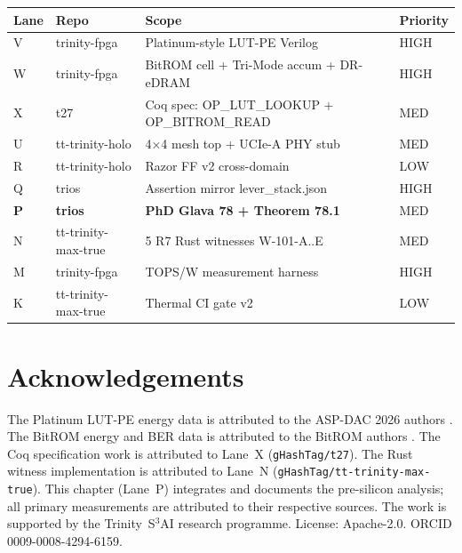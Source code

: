 \begin{center}
\begin{tabular}{llll}
\toprule
Lane & Repo & Scope & Priority \\
\midrule
V & trinity-fpga & Platinum-style LUT-PE Verilog   & HIGH \\
W & trinity-fpga & BitROM cell + Tri-Mode accum + DR-eDRAM & HIGH \\
X & t27          & Coq spec: OP\_LUT\_LOOKUP + OP\_BITROM\_READ & MED \\
U & tt-trinity-holo & 4×4 mesh top + UCIe-A PHY stub  & MED \\
R & tt-trinity-holo & Razor FF v2 cross-domain          & LOW \\
Q & trios        & Assertion mirror lever\_stack.json  & HIGH \\
\textbf{P} & \textbf{trios} & \textbf{PhD Glava 78 + Theorem 78.1} & MED \\
N & tt-trinity-max-true & 5 R7 Rust witnesses W-101-A..E & MED \\
M & trinity-fpga & TOPS/W measurement harness         & HIGH \\
K & tt-trinity-max-true & Thermal CI gate v2             & LOW \\
\bottomrule
\end{tabular}
\end{center}

\section*{Acknowledgements}

The Platinum LUT-PE energy data is attributed to the ASP-DAC 2026 authors
\cite{platinum_lut_pe_2026}.  The BitROM energy and BER data is attributed
to the BitROM authors \cite{bitrom_2025}.  The Coq specification work is
attributed to Lane~X (\texttt{gHashTag/t27}).  The Rust witness implementation
is attributed to Lane~N (\texttt{gHashTag/tt-trinity-max-true}).  This chapter
(Lane~P) integrates and documents the pre-silicon analysis; all primary
measurements are attributed to their respective sources.  The work is supported
by the Trinity~S\(^{3}\)AI research programme.
License: Apache-2.0.  ORCID 0009-0008-4294-6159.




